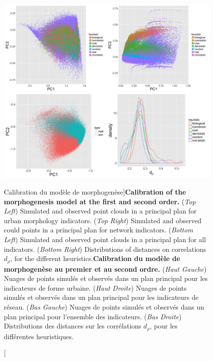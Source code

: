 \begin{figure}
	\includegraphics[width=\linewidth]{Figures/Final/7-2-2-fig-mesocoevolmodel-calibration.jpg}
	\caption[Calibration of the morphogenesis model][Calibration du modèle de morphogenèse]{\textbf{Calibration of the morphogenesis model at the first and second order.} (\textit{Top Left}) Simulated and observed point clouds in a principal plan for urban morphology indicators. (\textit{Top Right}) Simulated and observed could points in a principal plan for network indicators. (\textit{Bottom Left}) Simulated and observed point clouds in a principal plan for all indicators. (\textit{Bottom Right}) Distributions of distances on correlations $d_{\rho}$, for the different heuristics.\label{fig:mesocoevolmodel:calibration}}{\textbf{Calibration du modèle de morphogenèse au premier et au second ordre.} (\textit{Haut Gauche}) Nuages de points simulés et observés dans un plan principal pour les indicateurs de forme urbaine. (\textit{Haut Droite}) Nuages de points simulés et observés dans un plan principal pour les indicateurs de réseau. (\textit{Bas Gauche}) Nuages de points simulés et observés dans un plan principal pour l'ensemble des indicateurs. (\textit{Bas Droite}) Distributions des distances sur les corrélations $d_{\rho}$, pour les différentes heuristiques.\label{fig:mesocoevolmodel:calibration}}
\end{figure}


